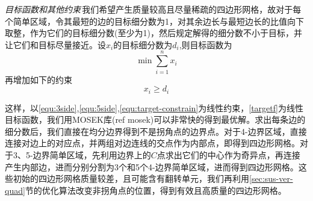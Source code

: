 \emph{目标函数和其他约束}\,我们希望产生质量较高且尽量稀疏的四边形网格，故对于每个简单区域，令其最短的边的目标细分数为1，对其余边长与最短边长的比值向下取整，作为它们的目标细分数(至少为1)，然后规定解得的细分数不小于目标，并让它们和目标尽量接近。设$x_i$的目标细分数为$d_i$,则目标函数为
\begin{equation}\label{equ:targetf}
\min \sum_{i=1}^{n} x_i
\end{equation}
再增加如下的约束
\begin{equation} \label{equ:target-constrain}
x_i \geq d_i
\end{equation}

这样，以\ref{equ:3side},\ref{equ:5side},\ref{equ:target-constrain}为线性约束，\ref{targetf}为线性目标函数，我们用MOSEK库(ref mosek)可以非常快的得到最优解。求出每条边的细分数后，我们直接在均分边界得到不是拐角点的边界点。对于4-边界区域，直接连接对边上的对应点，并两组对边连线的交点作为内部点，即得到四边形网格。对于3、5-边界简单区域，先利用边界上的$C$点求出它们的中心作为奇异点，再连接产生内部边，进而分别分割为3个和5个4-边界简单区域，进而得到四边形网格。这些初始的四边形网格质量较差，且可能含有翻转单元，我们再利用\ref{sec:sus-ver-quad}节的优化算法改变非拐角点的位置，得到有效且高质量的四边形网格。
